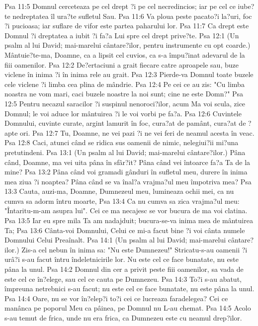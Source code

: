 Psa 11:5  Domnul cerceteaza pe cel drept ?i pe cel necredincios; iar pe cel ce iube?te nedreptatea îl ura?te sufletul Sau.
Psa 11:6  Va ploua peste pacato?i la?uri, foc ?i pucioasa; iar suflare de vifor este partea paharului lor.
Psa 11:7  Ca drept este Domnul ?i dreptatea a iubit ?i fa?a Lui spre cel drept prive?te.
Psa 12:1  (Un psalm al lui David; mai-marelui cântare?ilor, pentru instrumente cu opt coarde.) Mântuie?te-ma, Doamne, ca a lipsit cel cuvios, ca s-a împu?inat adevarul de la fiii oamenilor.
Psa 12:2  De?ertaciuni a grait fiecare catre aproapele sau, buze viclene în inima ?i în inima rele au grait.
Psa 12:3  Pierde-va Domnul toate buzele cele viclene ?i limba cea plina de mândrie.
Psa 12:4  Pe cei ce au zis: "Cu limba noastra ne vom mari, caci buzele noastre la noi sunt; cine ne este Domn?"
Psa 12:5  Pentru necazul saracilor ?i suspinul nenoroci?ilor, acum Ma voi scula, zice Domnul; le voi aduce lor mântuirea ?i le voi vorbi pe fa?a.
Psa 12:6  Cuvintele Domnului, cuvinte curate, argint lamurit în foc, cura?at de pamânt, cura?at de ?apte ori.
Psa 12:7  Tu, Doamne, ne vei pazi ?i ne vei feri de neamul acesta în veac.
Psa 12:8  Caci, atunci când se ridica sus oamenii de nimic, nelegiui?ii mi?una pretutindeni.
Psa 13:1  (Un psalm al lui David; mai-marelui cântare?ilor.) Pâna când, Doamne, ma vei uita pâna în sfâr?it? Pâna când vei întoarce fa?a Ta de la mine?
Psa 13:2  Pâna când voi gramadi gânduri în sufletul meu, durere în inima mea ziua ?i noaptea? Pâna când se va înal?a vrajma?ul meu împotriva mea?
Psa 13:3  Cauta, auzi-ma, Doamne, Dumnezeul meu, lumineaza ochii mei, ca nu cumva sa adorm întru moarte,
Psa 13:4  Ca nu cumva sa zica vrajma?ul meu: "Întaritu-m-am asupra lui". Cei ce ma necajesc se vor bucura de ma voi clatina.
Psa 13:5  Iar eu spre mila Ta am nadajduit; bucura-se-va inima mea de mântuirea Ta;
Psa 13:6  Cânta-voi Domnului, Celui ce mi-a facut bine ?i voi cânta numele Domnului Celui Preaînalt.
Psa 14:1  (Un psalm al lui David; mai-marelui cântare?ilor.) Zis-a cel nebun în inima sa: "Nu este Dumnezeu!" Stricatu-s-au oamenii ?i urâ?i s-au facut întru îndeletnicirile lor. Nu este cel ce face bunatate, nu este pâna la unul.
Psa 14:2  Domnul din cer a privit peste fiii oamenilor, sa vada de este cel ce în?elege, sau cel ce cauta pe Dumnezeu.
Psa 14:3  To?i s-au abatut, împreuna netrebnici s-au facut; nu este cel ce face bunatate, nu este pâna la unul.
Psa 14:4  Oare, nu se vor în?elep?i to?i cei ce lucreaza faradelegea? Cei ce manânca pe poporul Meu ca pâinea, pe Domnul nu L-au chemat.
Psa 14:5  Acolo s-au temut de frica, unde nu era frica, ca Dumnezeu este cu neamul drep?ilor.
